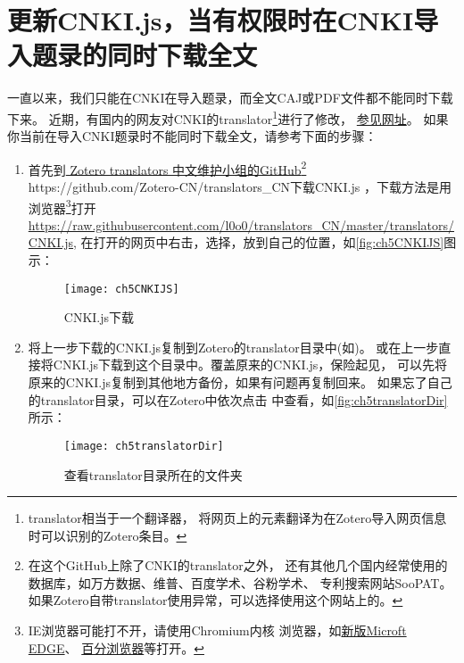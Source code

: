 \documentclass[cn,11pt,chinese]{elegantbook}
\begin{document}
	\section{更新CNKI.js，当有权限时在CNKI导入题录的同时下载全文}\label{sec:cnki_fulltext}
				一直以来，我们只能在CNKI在导入题录，而全文CAJ或PDF文件都不能同时下载下来。
				近期，有国内的网友对CNKI的translator\footnote{translator相当于一个翻译器，
				将网页上的元素翻译为在Zotero导入网页信息时可以识别的Zotero条目。}进行了修改，
				\href{https://www.linxingzhong.top/posts/2019-11-5/?tdsourcetag=s_pctim_aiomsg}{参见网址}。
				如果你当前在导入CNKI题录时不能同时下载全文，请参考下面的步骤：
			\begin{enumerate}
				\item\label{it:cnkijs}
					首先到\href{https://github.com/Zotero-CN/translators_CN}{ Zotero translators 
					中文维护小组的GitHub\footnote{在这个GitHub上除了CNKI的translator之外，
					还有其他几个国内经常使用的数据库，如万方数据、维普、百度学术、谷粉学术、
					专利搜索网站SooPAT。如果Zotero自带translator使用异常，可以选择使用这个网站上的。} 
					\url{ https://github.com/Zotero-CN/translators_CN}}下载CNKI.js
					，下载方法是用浏览器\footnote{IE浏览器可能打不开，请使用Chromium内核
					浏览器，如\href{https://www.microsoft.com/zh-cn/edge}{新版Microft EDGE}、
					\href{http://www.centbrowser.cn/history.html}{百分浏览器}等打开。}打开
					\url{https://raw.githubusercontent.com/l0o0/translators_CN/master/translators/CNKI.js},
					在打开的网页中右击，选择，放到自己的位置，如\autoref{fig:ch5CNKIJS}图示：
					\begin{figure}[htbp]
						\centering
						\texttt{[image: ch5CNKIJS]}
						\caption{CNKI.js下载}
						\label{fig:ch5CNKIJS}
					\end{figure}
				\item
				  将上一步下载的CNKI.js复制到Zotero的translator目录中(如)。
				  或在上一步直接将CNKI.js下载到这个目录中。覆盖原来的CNKI.js，保险起见，
				  可以先将原来的CNKI.js复制到其他地方备份，如果有问题再复制回来。
				  如果忘了自己的translator目录，可以在Zotero中依次点击
				  中查看，如\autoref{fig:ch5translatorDir}所示：
					  \begin{figure}[htbp]
					  	\centering
					  	\texttt{[image: ch5translatorDir]}
					  	\caption{查看translator目录所在的文件夹}
					  	\label{fig:ch5translatorDir}
					  \end{figure}

\end{enumerate}
\end{document}
